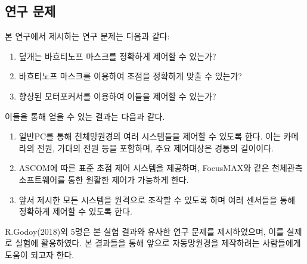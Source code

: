 \begin{comment}
제작한 모터 포커서 컨트롤러는 GS-touch로 명명하였다. GS-touch는 스테핑 모터를 구동할 수 있고 컴퓨터로 제어할 수 있도록 설계하였으며, 전용 ASCOM (Astronomy Common Object Model) dirver를 개발하여 ASCOM을 지원하는 천문 소프트웨어를 이용하여 쉽게 사용할 수 있도록 하였다.
\end{comment}



\subsection{연구 문제}

본 연구에서 제시하는 연구 문제는 다음과 같다:
\begin{enumerate}
	
	\item 덮개는 바흐티노프 마스크를 정확하게 제어할 수 있는가?
	\item 바흐티노프 마스크를 이용하여 초점을 정확하게 맞출 수 있는가?
	\item 향상된 모터포커서를 이용하여 이들을 제어할 수 있는가?
	
\end{enumerate}
이들을 통해 얻을 수 있는 결과는 다음과 같다.

\begin{enumerate}
	
	\item 일반PC를 통해 천체망원경의 여러 시스템들을 제어할 수 있도록 한다. 이는 카메라의 전원, 가대의 전원 등을 포함하며, 주요 제어대상은 경통의 길이이다.
	\item ASCOM에 따른 표준 초점 제어 시스템을 제공하며, FocusMAX와 같은 천체관측 소프트웨어를 통한 원활한 제어가 가능하게 한다.
	\item 앞서 제시한 모든 시스템을 원격으로 조작할 수 있도록 하며 여러 센서들을 통해 정확하게 제어할 수 있도록 한다.
\end{enumerate}	

R.Godoy(2018)외 5명은 본 실험 결과와 유사한 연구 문제를 제시하였으며\cite{godoy2018control}, 이를 실제로 실험에 활용하였다. 본 결과들을 통해 앞으로 자동망원경을 제작하려는 사람들에게 도움이 되고자 한다.
